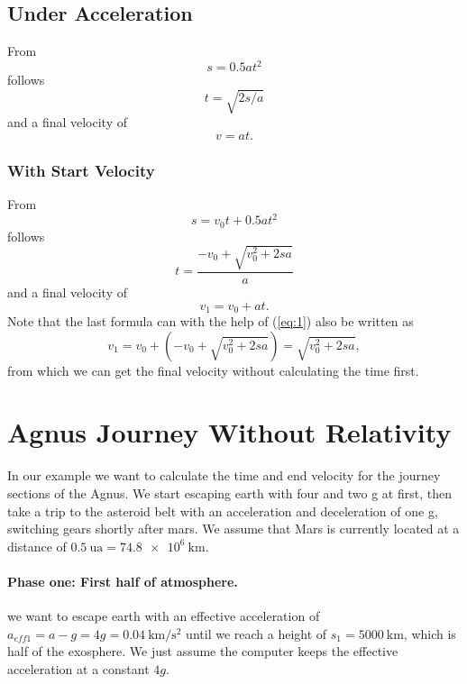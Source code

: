 \documentclass[10pt]{article}
\numberwithin{equation}{section}
\begin{document}
	\subsection{Under Acceleration}
	
	From	
	\begin{equation}
		s = 0.5at^2	\end{equation}
	follows	
	\begin{equation}
		t = \sqrt{2s/a}	\end{equation}	
	and a final velocity of	
	\begin{equation}
		v=at. \end{equation}
	
	\subsubsection{With Start Velocity}
	
	From	
	\begin{equation}
		s = v_0t + 0.5at^2 \end{equation}	
	follows	
	\begin{equation}\label{eq:1}
		t = \frac{-v_0 + \sqrt{v^2_0 + 2sa}}{a}	\end{equation}	
	and a final velocity of	
	\begin{equation}
		v_1 = v_0 + at.	\end{equation}	
	Note that the last formula can with the help of (\ref{eq:1}) also be written as	
	\begin{equation}
		v_1=v_0 + (-v_0 + \sqrt{v^2_0+2sa}) = \sqrt{v^2_0+2sa},	\end{equation}	
	from which we can get the final velocity without calculating the time first.
	
	\section{Agnus Journey Without Relativity}
	
	In our example we want to calculate the time and end velocity for the journey sections of the Agnus. We start escaping earth with four and two g at first, then take a trip to the asteroid belt with an acceleration and deceleration of one g, switching gears shortly after mars. We assume that Mars is currently located at a distance of $\SI{0.5}{\astronomicalunit} = \SI{74.8e+6}{\km}$.
	
	\paragraph{Phase one: First half of atmosphere.}
	we want to escape earth with an effective acceleration of $a_{eff1} = a-g = 4g = \SI{0.04}{\km\per\s\squared}$ until we reach a height of $s_1= \SI{5000}{\km}$, which is half of the exosphere. We just assume the computer keeps the effective acceleration at a constant $4g$.
	
\end{document}
